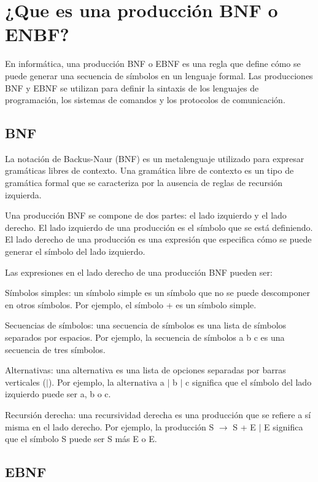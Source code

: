 \section{¿Que es una producción BNF o ENBF?}

\noindent En informática, una producción BNF o EBNF es una regla que define cómo se puede generar una secuencia de símbolos en un lenguaje formal. Las producciones BNF y EBNF se utilizan para definir la sintaxis de los lenguajes de programación, los sistemas de comandos y los protocolos de comunicación.

\subsection{BNF}

\noindent La notación de Backus-Naur (BNF) es un metalenguaje utilizado para expresar gramáticas libres de contexto. Una gramática libre de contexto es un tipo de gramática formal que se caracteriza por la ausencia de reglas de recursión izquierda.

Una producción BNF se compone de dos partes: el lado izquierdo y el lado derecho. El lado izquierdo de una producción es el símbolo que se está definiendo. El lado derecho de una producción es una expresión que especifica cómo se puede generar el símbolo del lado izquierdo.

Las expresiones en el lado derecho de una producción BNF pueden ser:

    Símbolos simples: un símbolo simple es un símbolo que no se puede descomponer en otros símbolos. Por ejemplo, el símbolo + es un símbolo simple.
    
    Secuencias de símbolos: una secuencia de símbolos es una lista de símbolos separados por espacios. Por ejemplo, la secuencia de símbolos a b c es una secuencia de tres símbolos.
    
    Alternativas: una alternativa es una lista de opciones separadas por barras verticales ($|$). Por ejemplo, la alternativa a $|$ b $|$ c significa que el símbolo del lado izquierdo puede ser a, b o c.
    
    Recursión derecha: una recursividad derecha es una producción que se refiere a sí misma en el lado derecho. Por ejemplo, la producción S $\xrightarrow{}$ S + E $|$ E significa que el símbolo S puede ser S más E o E.

\subsection{EBNF}

